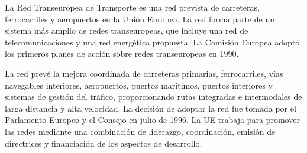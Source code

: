 La Red Transeuropea de Transporte es una red prevista de carreteras, ferrocarriles y aeropuertos en la Unión Europea. La red forma parte de un sistema más amplio de redes transeuropeas, que incluye una red de telecomunicaciones y una red energética propuesta. La Comisión Europea adoptó los primeros planes de acción sobre redes transeuropeas en 1990.

La red prevé la mejora coordinada de carreteras primarias, ferrocarriles, vías navegables interiores, aeropuertos, puertos marítimos, puertos interiores y sistemas de gestión del tráfico, proporcionando rutas integradas e intermodales de larga distancia y alta velocidad. La decisión de adoptar la red fue tomada por el Parlamento Europeo y el Consejo en julio de 1996. La UE trabaja para promover las redes mediante una combinación de liderazgo, coordinación, emisión de directrices y financiación de los aspectos de desarrollo.

